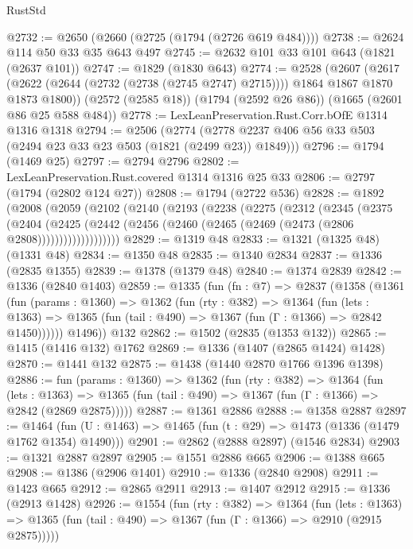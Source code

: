 \begin{lexlean}{RustStd}
\begin{coremodule}
{\begin{coremodule}
{{{{{{{{{{{{{{@2732 := @2650 (@2660 (@2725 (@1794 (@2726 @619 @484))))
@2738 := @2624 @114 @50 @33 @35 @643 @497
@2745 := @2632 @101 @33 @101 @643 (@1821 (@2637 @101))
@2747 := @1829 (@1830 @643)
@2774 := @2528
    (@2607
      (@2617 (@2622 (@2644 (@2732 (@2738 (@2745 @2747) @2715)))) @1864 @1867 @1870 @1873 @1800))
    (@2572 (@2585 @18))
    (@1794 (@2592 @26 @86))
    (@1665 (@2601 @86 @25 @588 @484))
@2778 := LexLeanPreservation.Rust.Corr.bOfE @1314 @1316 @1318
@2794 := @2506
    (@2774 (@2778 @2237 @406 @56 @33 @503 (@2494 @23 @33 @23 @503 (@1821 (@2499 @23)) @1849)))
@2796 := @1794 (@1469 @25)
@2797 := @2794 @2796
@2802 := LexLeanPreservation.Rust.covered @1314 @1316 @25 @33
@2806 := @2797 (@1794 (@2802 @124 @27))
@2808 := @1794 (@2722 @536)
@2828 := @1892
    (@2008
      (@2059
        (@2102
          (@2140
            (@2193
              (@2238
                (@2275
                  (@2312
                    (@2345
                      (@2375
                        (@2404
                          (@2425
                            (@2442
                              (@2456 (@2460 (@2465 (@2469 (@2473 (@2806 @2808)))))))))))))))))))
@2829 := @1319 @48
@2833 := @1321 (@1325 @48) (@1331 @48)
@2834 := @1350 @48
@2835 := @1340 @2834
@2837 := @1336 (@2835 @1355)
@2839 := @1378 (@1379 @48)
@2840 := @1374 @2839
@2842 := @1336 (@2840 @1403)
@2859 := @1335
    (fun (fn : @7) =>
    @2837
      (@1358
        (@1361
          (fun (params : @1360) =>
          @1362
            (fun (rty : @382) =>
            @1364
              (fun (lets : @1363) =>
              @1365 (fun (tail : @490) => @1367 (fun (Γ : @1366) => @2842 @1450))))))
        @1496))
    @132
@2862 := @1502 (@2835 (@1353 @132))
@2865 := @1415 (@1416 @132) @1762
@2869 := @1336 (@1407 (@2865 @1424) @1428)
@2870 := @1441 @132
@2875 := @1438 (@1440 @2870 @1766 @1396 @1398)
@2886 := fun (params : @1360) =>
  @1362
    (fun (rty : @382) =>
    @1364
      (fun (lets : @1363) =>
      @1365 (fun (tail : @490) => @1367 (fun (Γ : @1366) => @2842 (@2869 @2875)))))
@2887 := @1361 @2886
@2888 := @1358 @2887
@2897 := @1464 (fun (U : @1463) => @1465 (fun (t : @29) => @1473 (@1336 (@1479 @1762 @1354) @1490)))
@2901 := @2862 (@2888 @2897) (@1546 @2834)
@2903 := @1321 @2887 @2897
@2905 := @1551 @2886 @665
@2906 := @1388 @665
@2908 := @1386 (@2906 @1401)
@2910 := @1336 (@2840 @2908)
@2911 := @1423 @665
@2912 := @2865 @2911
@2913 := @1407 @2912
@2915 := @1336 (@2913 @1428)
@2926 := @1554
    (fun (rty : @382) =>
    @1364
      (fun (lets : @1363) =>
      @1365 (fun (tail : @490) => @1367 (fun (Γ : @1366) => @2910 (@2915 @2875)))))
}}}}}}}}}}}}}}
\end{coremodule}}
\end{coremodule}
\end{lexlean}
